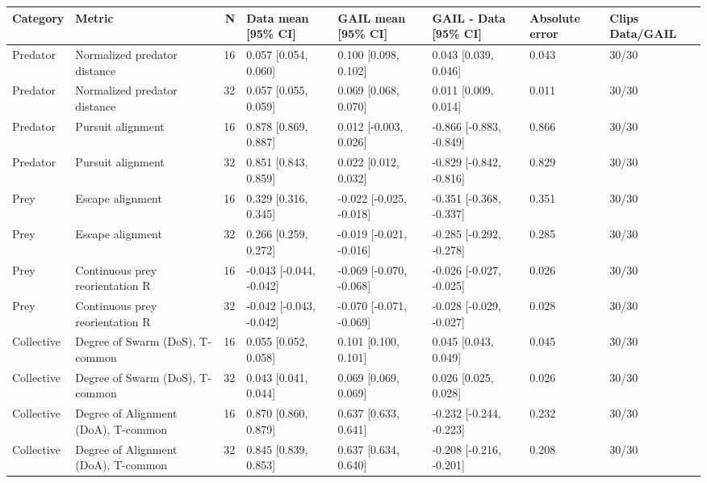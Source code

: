 \begin{tabular}{llrlllll}
\toprule
Category & Metric & N & Data mean [95\% CI] & GAIL mean [95\% CI] & GAIL - Data [95\% CI] & Absolute error & Clips Data/GAIL \\
\midrule
Predator & Normalized predator distance & 16 & 0.057 [0.054, 0.060] & 0.100 [0.098, 0.102] & 0.043 [0.039, 0.046] & 0.043 & 30/30 \\
Predator & Normalized predator distance & 32 & 0.057 [0.055, 0.059] & 0.069 [0.068, 0.070] & 0.011 [0.009, 0.014] & 0.011 & 30/30 \\
Predator & Pursuit alignment & 16 & 0.878 [0.869, 0.887] & 0.012 [-0.003, 0.026] & -0.866 [-0.883, -0.849] & 0.866 & 30/30 \\
Predator & Pursuit alignment & 32 & 0.851 [0.843, 0.859] & 0.022 [0.012, 0.032] & -0.829 [-0.842, -0.816] & 0.829 & 30/30 \\
Prey & Escape alignment & 16 & 0.329 [0.316, 0.345] & -0.022 [-0.025, -0.018] & -0.351 [-0.368, -0.337] & 0.351 & 30/30 \\
Prey & Escape alignment & 32 & 0.266 [0.259, 0.272] & -0.019 [-0.021, -0.016] & -0.285 [-0.292, -0.278] & 0.285 & 30/30 \\
Prey & Continuous prey reorientation R & 16 & -0.043 [-0.044, -0.042] & -0.069 [-0.070, -0.068] & -0.026 [-0.027, -0.025] & 0.026 & 30/30 \\
Prey & Continuous prey reorientation R & 32 & -0.042 [-0.043, -0.042] & -0.070 [-0.071, -0.069] & -0.028 [-0.029, -0.027] & 0.028 & 30/30 \\
Collective & Degree of Swarm (DoS), T-common & 16 & 0.055 [0.052, 0.058] & 0.101 [0.100, 0.101] & 0.045 [0.043, 0.049] & 0.045 & 30/30 \\
Collective & Degree of Swarm (DoS), T-common & 32 & 0.043 [0.041, 0.044] & 0.069 [0.069, 0.069] & 0.026 [0.025, 0.028] & 0.026 & 30/30 \\
Collective & Degree of Alignment (DoA), T-common & 16 & 0.870 [0.860, 0.879] & 0.637 [0.633, 0.641] & -0.232 [-0.244, -0.223] & 0.232 & 30/30 \\
Collective & Degree of Alignment (DoA), T-common & 32 & 0.845 [0.839, 0.853] & 0.637 [0.634, 0.640] & -0.208 [-0.216, -0.201] & 0.208 & 30/30 \\
\bottomrule
\end{tabular}
